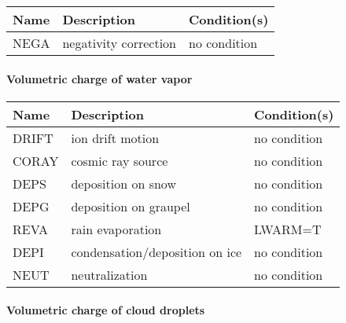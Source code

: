 \begin{longtable} {|p{}|p{}|p{}|}
\hline
Name & Description & Condition(s) \\
\hline \hline
\endhead
NEGA   & negativity correction & no condition \\\hline
\end{longtable}

\paragraph{Volumetric charge of water vapor}
\mbox{} %

\begin{longtable} {|p{}|p{}|p{}|}
\hline
Name & Description & Condition(s) \\
\hline \hline
\endhead
DRIFT  & ion drift motion               & no condition \\\hline
CORAY  & cosmic ray source              & no condition \\\hline
DEPS   & deposition on snow             & no condition \\\hline
DEPG   & deposition on graupel          & no condition \\\hline
REVA   & rain evaporation               & LWARM=T      \\\hline
DEPI   & condensation/deposition on ice & no condition \\\hline
NEUT   & neutralization                 & no condition \\\hline
\end{longtable}

\paragraph{Volumetric charge of cloud droplets}
\mbox{} %

